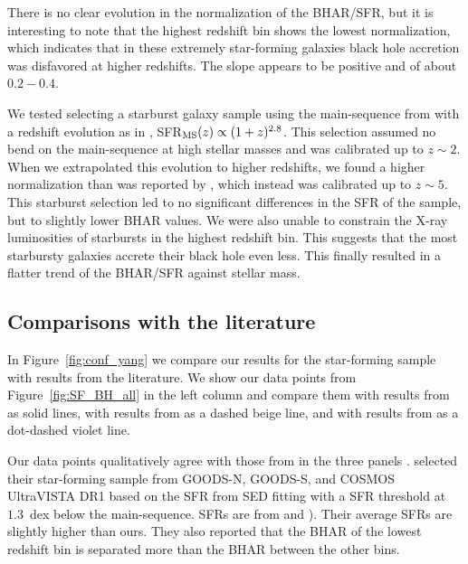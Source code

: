     There is no clear evolution in the normalization of the BHAR/SFR, but it is interesting to note that the highest redshift bin shows the lowest normalization, which indicates that in these extremely star-forming galaxies black hole accretion was disfavored at higher redshifts. The slope appears to be positive and of about $0.2-0.4$.
    
    We tested selecting a starburst galaxy sample using the main-sequence from \citet{2011ApJ...739L..40R} with a redshift evolution as in \citet{2012ApJ...747L..31S}, SFR$_{\rm MS}(z)\propto (1+z)^{2.8}$. This selection assumed no bend on the main-sequence at high stellar masses and was calibrated up to $z\sim 2$. When we extrapolated this evolution to higher redshifts, we found a higher normalization than was reported by \citet{2015A&A...575A..74S}, which instead was calibrated up to $z\sim5$. This starburst selection led to no significant differences in the SFR of the sample, but to slightly lower BHAR values. We were also unable to constrain the X-ray luminosities of starbursts in the highest redshift bin. This suggests that the most starbursty galaxies accrete their black hole even less. This finally resulted in a flatter trend of the BHAR/SFR against stellar mass.


\subsection{Comparisons with the literature} \label{sec:compare}
In Figure~\ref{fig:conf_yang} we compare our results for the star-forming sample with results from the literature. We show our data points from 
Figure~\ref{fig:SF_BH_all} in the left column and compare them with results from \citet{2018MNRAS.475.1887Y} as solid lines, with results from \citet{2019MNRAS.484.4360A} as a dashed beige line, and with results from \citet{2019ApJ...885L..36D} as a dot-dashed violet line.

         Our data points qualitatively agree with those from \citet{2018MNRAS.475.1887Y} in the three panels%
         . \citet{2018MNRAS.475.1887Y} selected their star-forming sample from GOODS-N, GOODS-S, and COSMOS UltraVISTA DR1 based on the SFR from SED fitting with a SFR threshold at $1.3$~dex below the main-sequence. SFRs are from \citet{2015ApJ...801...97S} and \citet{2019ApJS..243...22B}). Their average SFRs are slightly higher than ours. They also reported that the BHAR of the lowest redshift bin is separated more than the BHAR between the other bins.
         
